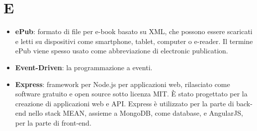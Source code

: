 \section{E}
\begin{itemize} 
	\item \textbf{ePub}: formato di file per e-book basato su XML, che possono essere scaricati e letti su dispositivi come smartphone, tablet, computer o e-reader. Il termine ePub viene spesso usato come abbreviazione di electronic publication.
	\item \textbf{Event-Driven}: la programmazione a eventi.
	\item \textbf{Express}: framework per Node.js per applicazioni web, rilasciato come software gratuito e open source sotto licenza MIT. È stato progettato per la creazione di applicazioni web e API. Express è utilizzato per la parte di back-end nello stack MEAN, assieme a MongoDB, come database, e AngularJS, per la parte di front-end.
\end{itemize}